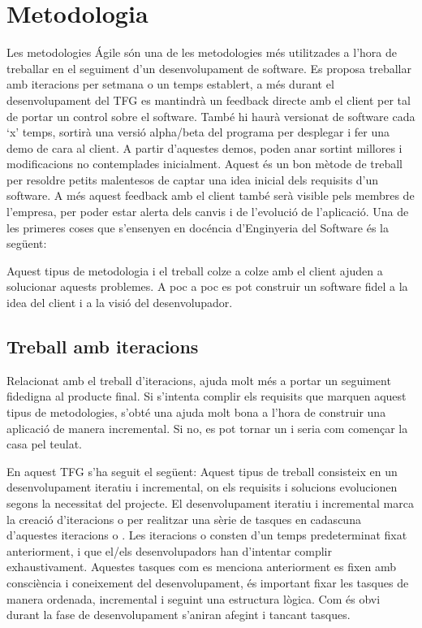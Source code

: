 \documentclass[letterpaper,11pt,catalan]{sphinxmanual}
\begin{document}
\chapter{Metodologia}
\label{\detokenize{index:metodologia}}
Les metodologies Ágile són una de les metodologies més utilitzades a l'hora de treballar en
el seguiment d'un desenvolupament de software.
Es proposa treballar amb iteracions per setmana o un temps establert, a més durant el desenvolupament del TFG
es mantindrà un feedback directe amb el client per tal de portar un control sobre el software.
També hi haurà versionat de software cada `x' temps, sortirà una versió alpha/beta del programa
per desplegar i fer una demo de cara al client. A partir d'aquestes demos, poden anar
sortint millores i modificacions no contemplades inicialment. Aquest és un bon mètode
de treball per resoldre petits malentesos de captar una idea inicial dels requisits d'un software.
A més aquest feedback amb el client també serà visible pels membres de l'empresa, per poder estar alerta dels canvis i de l'evolució de l'aplicació.
Una de les primeres coses que s'ensenyen en docéncia d'Enginyeria del Software és la següent:


Aquest tipus de metodologia i el treball colze a colze amb el client ajuden a solucionar
aquests problemes. A poc a poc es pot construir un software fidel a la idea del client i a
la visió del desenvolupador.


\section{Treball amb iteracions}
\label{\detokenize{index:treball-amb-iteracions}}
Relacionat amb el treball d'iteracions, ajuda molt més a portar un seguiment fidedigna
al producte final. Si s'intenta complir els requisits que marquen aquest tipus de
metodologies, s'obté una ajuda molt bona a l'hora de construir una aplicació de manera incremental. Si no, es pot
tornar un  i seria com començar la casa pel teulat.

En aquest TFG s'ha seguit el següent:
Aquest tipus de treball consisteix en un desenvolupament iteratiu i incremental, on
els requisits i solucions evolucionen segons la necessitat del projecte. El desenvolupament
iteratiu i incremental marca la creació d'iteracions o  per realitzar una sèrie
de tasques en cadascuna d'aquestes iteracions o .
Les iteracions o  consten d'un temps predeterminat fixat anteriorment, i que el/els desenvolupadors
han d'intentar complir exhaustivament. Aquestes tasques com es menciona anteriorment es
fixen amb consciència i coneixement del desenvolupament, és important fixar les tasques
de manera ordenada, incremental i seguint una estructura lògica. Com és obvi durant
la fase de desenvolupament s'aniran afegint i tancant tasques.
\end{document}
